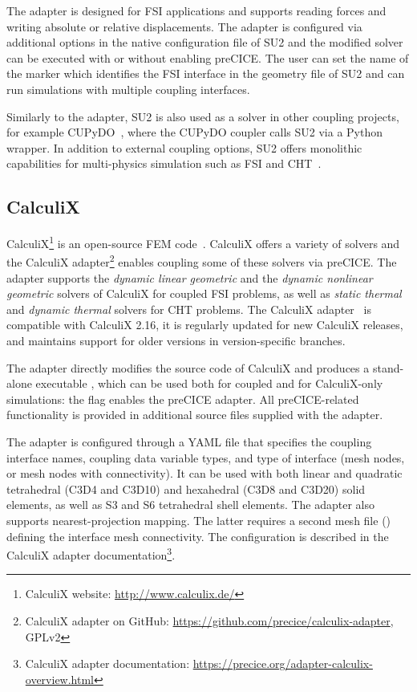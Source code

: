 The adapter is designed for FSI applications and supports reading forces and writing absolute or relative displacements. The adapter is configured via additional options in the native configuration file of SU2 and the modified solver can be executed with or without enabling preCICE. The user can set the name of the marker which identifies the FSI interface in the geometry file of SU2 and can run simulations with multiple coupling interfaces.

Similarly to the adapter, SU2 is also used as a solver in other coupling projects, for example CUPyDO~\cite{CUPyDO-THOMAS201969}, where the CUPyDO coupler calls SU2 via a Python wrapper. In addition to external coupling options, SU2 offers monolithic capabilities for multi-physics simulation such as FSI and CHT~\cite{SU2-multiphysics, SU2-FSI-monolithic}.

\subsection{CalculiX} 

CalculiX\footnote{CalculiX website: \url{http://www.calculix.de/}} is an open-source FEM code~\cite{Dhondt2004_CalculiX}. CalculiX offers a variety of solvers and the CalculiX adapter\footnote{CalculiX adapter on GitHub: \url{https://github.com/precice/calculix-adapter}, GPLv2} enables coupling some of these solvers via preCICE. The adapter supports the \emph{dynamic linear geometric} and the \emph{dynamic nonlinear geometric} solvers of CalculiX for coupled FSI problems, as well as \emph{static thermal} and \emph{dynamic thermal} solvers for CHT problems. The CalculiX adapter~\cite{CheungYau2016, Uekermann2017_Adapters} is compatible with CalculiX 2.16, it is regularly updated for new CalculiX releases, and maintains support for older versions in version-specific branches.

The adapter directly modifies the source code of CalculiX and produces a stand-alone executable , which can be used both for coupled and for CalculiX-only simulations: the flag  enables the preCICE adapter. All preCICE-related functionality is provided in additional source files supplied with the adapter.

The adapter is configured through a YAML file that specifies the coupling interface names, coupling data variable types, and type of interface (mesh nodes, or mesh nodes with connectivity).
 It can be used with both linear and quadratic tetrahedral (C3D4 and C3D10) and hexahedral (C3D8 and C3D20) solid elements, as well as S3 and S6 tetrahedral shell elements. The adapter also supports nearest-projection mapping. The latter requires a second mesh file () defining the interface mesh connectivity. The configuration is described in the CalculiX adapter documentation\footnote{CalculiX adapter documentation: \url{https://precice.org/adapter-calculix-overview.html}}.

